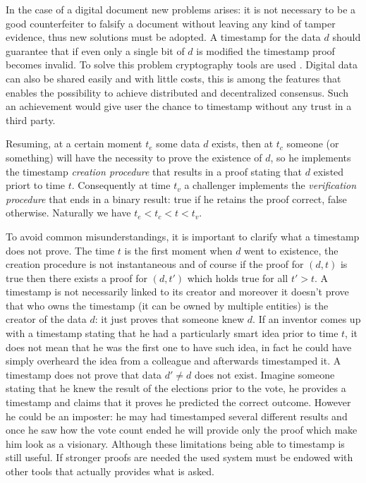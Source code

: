 In the case of a digital document new problems arises: it is not necessary to be a good counterfeiter to falsify a document without leaving any kind of tamper evidence, thus new solutions must be adopted. A timestamp for the data $d$ should guarantee that if even only a single bit of $d$ is modified the timestamp proof becomes invalid. To solve this problem cryptography tools are used \cite{Haber97securenames}. Digital data can also be shared easily and with little costs, this is among the features that enables the possibility to achieve distributed and decentralized consensus. Such an achievement would give user the chance to timestamp without any trust in a third party.

Resuming, at a certain moment $t_e$ some data $d$ exists, then at $t_c$ someone (or something) will have the necessity to prove the existence of $d$, so he implements the timestamp \textit{creation procedure} that results in a proof stating that $d$ existed priort to time $t$. Consequently at time $t_v$ a challenger implements the \textit{verification procedure} that ends in a binary result: true if he retains the proof correct, false otherwise. Naturally we have $t_e<t_c<t<t_v$.

To avoid common misunderstandings, it is important to clarify what a timestamp does not prove. The time $t$ is the first moment when $d$ went to existence, the creation procedure is not instantaneous and of course if the proof for $(d,t)$ is true then there exists a proof for $(d,t')$ which holds true for all $t'>t$. A timestamp is not necessarily linked to its creator and moreover it doesn't prove that who owns the timestamp (it can be owned by multiple entities) is the creator of the data $d$: it just proves that someone knew $d$. If an inventor comes up with a timestamp stating that he had a particularly smart idea prior to time $t$, it does not mean that he was the first one to have such idea, in fact he could have simply overheard the idea from a colleague and afterwards timestamped it. A timestamp does not prove that data $d' \neq d$ does not exist. Imagine someone stating that he knew the result of the elections prior to the vote, he provides a timestamp and claims that it proves he predicted the correct outcome. However he could be an imposter: he may had timestamped several different results and once he saw how the vote count ended he will provide only the proof which make him look as a visionary.
Although these limitations being able to timestamp is still useful. If stronger proofs are needed the used system must be endowed with other tools that actually provides what is asked. 

